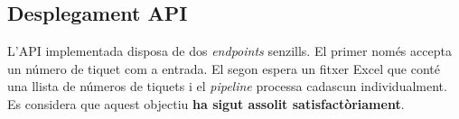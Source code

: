 \subsection{Desplegament API}
L'API implementada disposa de dos \textit{endpoints} senzills. El primer només accepta un número de tiquet com a entrada. El segon espera un fitxer Excel que conté una llista de números de tiquets i el \textit{pipeline} processa cadascun individualment. Es considera que aquest objectiu \textbf{ha sigut assolit satisfactòriament}.